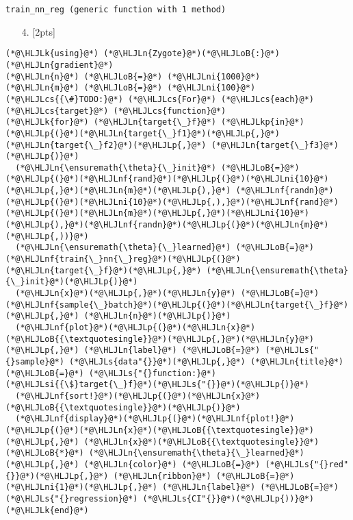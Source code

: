 \documentclass[12pt,a4paper]{article}
\newcommand{\HLJLk}[1]{\textcolor[RGB]{148,91,176}{\textbf{#1}}}
\newcommand{\HLJLkp}[1]{\textcolor[RGB]{148,91,176}{\textbf{#1}}}
\newcommand{\HLJLn}[1]{#1}
\newcommand{\HLJLnf}[1]{\textcolor[RGB]{66,102,213}{#1}}
\newcommand{\HLJLs}[1]{\textcolor[RGB]{201,61,57}{#1}}
\newcommand{\HLJLsi}[1]{#1}
\newcommand{\HLJLni}[1]{\textcolor[RGB]{59,151,46}{#1}}
\newcommand{\HLJLoB}[1]{\textcolor[RGB]{102,102,102}{\textbf{#1}}}
\newcommand{\HLJLp}[1]{#1}
\newcommand{\HLJLcs}[1]{\textcolor[RGB]{153,153,119}{\textit{#1}}}
\begin{document}
\begin{lstlisting}
train_nn_reg (generic function with 1 method)
\end{lstlisting}


\begin{itemize}
\item[4. ] [2pts]

\end{itemize}

\begin{lstlisting}
(*@\HLJLk{using}@*) (*@\HLJLn{Zygote}@*)(*@\HLJLoB{:}@*)(*@\HLJLn{gradient}@*)
(*@\HLJLn{n}@*) (*@\HLJLoB{=}@*) (*@\HLJLni{1000}@*)
(*@\HLJLn{m}@*) (*@\HLJLoB{=}@*) (*@\HLJLni{100}@*)
(*@\HLJLcs{{\#}TODO:}@*) (*@\HLJLcs{For}@*) (*@\HLJLcs{each}@*) (*@\HLJLcs{target}@*) (*@\HLJLcs{function}@*)
(*@\HLJLk{for}@*) (*@\HLJLn{target{\_}f}@*) (*@\HLJLkp{in}@*) (*@\HLJLp{(}@*)(*@\HLJLn{target{\_}f1}@*)(*@\HLJLp{,}@*) (*@\HLJLn{target{\_}f2}@*)(*@\HLJLp{,}@*) (*@\HLJLn{target{\_}f3}@*)(*@\HLJLp{)}@*)
  (*@\HLJLn{\ensuremath{\theta}{\_}init}@*) (*@\HLJLoB{=}@*) (*@\HLJLp{(}@*)(*@\HLJLnf{rand}@*)(*@\HLJLp{(}@*)(*@\HLJLni{10}@*)(*@\HLJLp{,}@*)(*@\HLJLn{m}@*)(*@\HLJLp{),}@*) (*@\HLJLnf{randn}@*)(*@\HLJLp{(}@*)(*@\HLJLni{10}@*)(*@\HLJLp{,),}@*)(*@\HLJLnf{rand}@*)(*@\HLJLp{(}@*)(*@\HLJLn{m}@*)(*@\HLJLp{,}@*)(*@\HLJLni{10}@*)(*@\HLJLp{),}@*)(*@\HLJLnf{randn}@*)(*@\HLJLp{(}@*)(*@\HLJLn{m}@*)(*@\HLJLp{,))}@*)
  (*@\HLJLn{\ensuremath{\theta}{\_}learned}@*) (*@\HLJLoB{=}@*) (*@\HLJLnf{train{\_}nn{\_}reg}@*)(*@\HLJLp{(}@*)(*@\HLJLn{target{\_}f}@*)(*@\HLJLp{,}@*) (*@\HLJLn{\ensuremath{\theta}{\_}init}@*)(*@\HLJLp{)}@*)
  (*@\HLJLn{x}@*)(*@\HLJLp{,}@*)(*@\HLJLn{y}@*) (*@\HLJLoB{=}@*) (*@\HLJLnf{sample{\_}batch}@*)(*@\HLJLp{(}@*)(*@\HLJLn{target{\_}f}@*)(*@\HLJLp{,}@*) (*@\HLJLn{n}@*)(*@\HLJLp{)}@*)
  (*@\HLJLnf{plot}@*)(*@\HLJLp{(}@*)(*@\HLJLn{x}@*)(*@\HLJLoB{{\textquotesingle}}@*)(*@\HLJLp{,}@*)(*@\HLJLn{y}@*)(*@\HLJLp{,}@*) (*@\HLJLn{label}@*) (*@\HLJLoB{=}@*) (*@\HLJLs{"{}sample}@*) (*@\HLJLs{data"{}}@*)(*@\HLJLp{,}@*) (*@\HLJLn{title}@*) (*@\HLJLoB{=}@*) (*@\HLJLs{"{}function:}@*) (*@\HLJLsi{{\$}target{\_}f}@*)(*@\HLJLs{"{}}@*)(*@\HLJLp{)}@*)
  (*@\HLJLnf{sort!}@*)(*@\HLJLp{(}@*)(*@\HLJLn{x}@*)(*@\HLJLoB{{\textquotesingle}}@*)(*@\HLJLp{)}@*)
  (*@\HLJLnf{display}@*)(*@\HLJLp{(}@*)(*@\HLJLnf{plot!}@*)(*@\HLJLp{(}@*)(*@\HLJLn{x}@*)(*@\HLJLoB{{\textquotesingle}}@*)(*@\HLJLp{,}@*) (*@\HLJLn{x}@*)(*@\HLJLoB{{\textquotesingle}}@*) (*@\HLJLoB{*}@*) (*@\HLJLn{\ensuremath{\theta}{\_}learned}@*)(*@\HLJLp{,}@*) (*@\HLJLn{color}@*) (*@\HLJLoB{=}@*) (*@\HLJLs{"{}red"{}}@*)(*@\HLJLp{,}@*) (*@\HLJLn{ribbon}@*) (*@\HLJLoB{=}@*) (*@\HLJLni{1}@*)(*@\HLJLp{,}@*) (*@\HLJLn{label}@*) (*@\HLJLoB{=}@*) (*@\HLJLs{"{}regression}@*) (*@\HLJLs{CI"{}}@*)(*@\HLJLp{))}@*)
(*@\HLJLk{end}@*)
\end{lstlisting}
\end{document}
